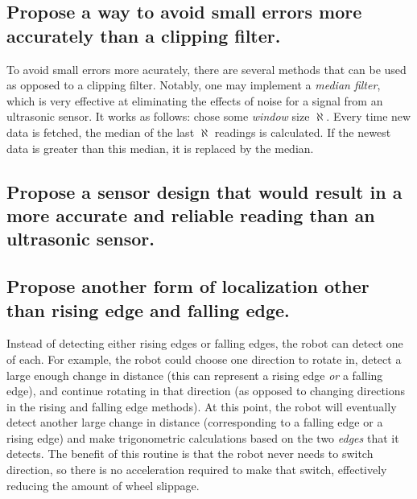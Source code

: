 \documentclass[11pt]{article}
\begin{document}
\subsection{Propose a way to avoid small errors more accurately than a clipping filter.}
To avoid small errors more acurately, there are several methods that can be used as opposed to a
clipping filter. Notably, one may implement a \textit{median filter}, which is very effective at
eliminating the effects of noise for a signal from an ultrasonic sensor. It works as follows: chose
some \textit{window} size $\aleph$. Every time new data is fetched, the median of the last $\aleph$
readings is calculated. If the newest data is greater than this median, it is replaced by the
median.

\subsection{Propose a sensor design that would result in a more accurate and reliable reading than
an ultrasonic sensor.}

\subsection{Propose another form of localization other than rising edge and falling edge.}
\par Instead of detecting either rising edges or falling edges, the robot can detect one of each. For
example, the robot could choose one direction to rotate in, detect a large enough change in distance
(this can represent a rising edge \textit{or} a falling edge), and continue rotating in that
direction (as opposed to changing directions in the rising and falling edge methods). At this point,
the robot will eventually detect another large change in distance (corresponding to a falling edge
or a rising edge) and make trigonometric calculations based on the two \textit{edges} that it
detects. The benefit of this routine is that the robot never needs to switch direction, so there is
no acceleration required to make that switch, effectively reducing the amount of wheel slippage.
\end{document}
